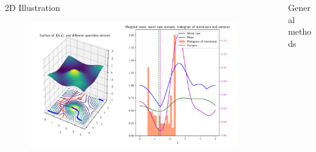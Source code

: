 \documentclass{beamer}
\newlength{\sepwid}
\newlength{\sndcolwid}
\begin{document}
\begin{frame}[t]
\begin{columns}[t]
\begin{column}{\sndcolwid}
\begin{block}{2D Illustration} 
    \begin{figure}[!h]
      \centering
      \includegraphics[width = .85\linewidth]{surface_transp_horiz}
    \end{figure}
  \end{block}
\end{column}

\begin{column}{\sepwid}\end{column} %
\begin{column}{\sndcolwid} %
 


%
  

  
 

\begin{block}{General methods}
  \begin{itemize}\large


\end{itemize}
\end{block}
\end{column}
\end{columns}
\end{frame}
\end{document}
